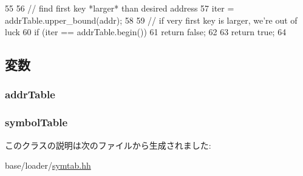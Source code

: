 \begin{DoxyCode}
55     {
56         // find first key *larger* than desired address
57         iter = addrTable.upper_bound(addr);
58 
59         // if very first key is larger, we're out of luck
60         if (iter == addrTable.begin())
61             return false;
62 
63         return true;
64     }
\end{DoxyCode}


\subsection{変数}
\hypertarget{classSymbolTable_a4be159a25acfb2f92b2504ddde718ac3}{
\subsubsection[{addrTable}]{ {\bf addrTable}}}
\label{classSymbolTable_a4be159a25acfb2f92b2504ddde718ac3}
\hypertarget{classSymbolTable_ab9b42e61946f386ede84d40320270925}{
\subsubsection[{symbolTable}]{ {\bf symbolTable}}}
\label{classSymbolTable_ab9b42e61946f386ede84d40320270925}


このクラスの説明は次のファイルから生成されました:\begin{DoxyCompactItemize}
\item 
base/loader/\hyperlink{symtab_8hh}{symtab.hh}\end{DoxyCompactItemize}
